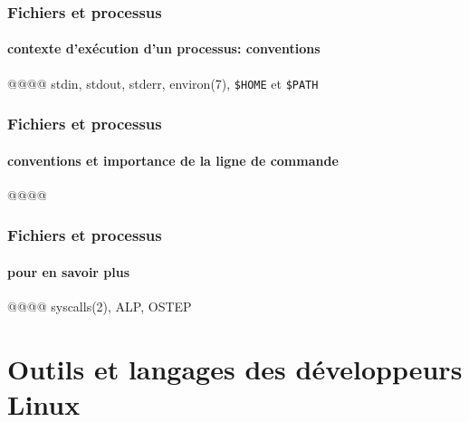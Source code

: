 \documentclass[xcolor=svgnames,final,smaller,a4]{beamer}
\begin{document}
\begin{frame}
  \frametitle{Fichiers et processus}
  \framesubtitle{contexte d'exécution d'un processus: conventions}
  
  @@@@ stdin, stdout, stderr, environ(7), \texttt{\$HOME} et \texttt{\$PATH}
\end{frame}


\begin{frame}
  \frametitle{Fichiers et processus}
  \framesubtitle{conventions et importance de la ligne de commande}

  @@@@
\end{frame}


\begin{frame}
  \frametitle{Fichiers et processus}
  \framesubtitle{pour en savoir plus}

  @@@@ syscalls(2), ALP, OSTEP
\end{frame}


\section{Outils et langages des développeurs Linux}
\end{document}
